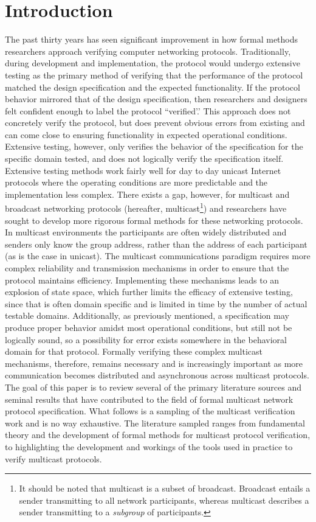 \documentclass[11pt, journal]{IEEEtran}
\begin{document}
\section{Introduction}
The past thirty years has seen significant improvement in how formal methods researchers approach verifying computer networking protocols. Traditionally, during development and implementation, the protocol would undergo extensive testing as the primary method of verifying that the performance of the protocol matched the design specification and the expected functionality. If the protocol behavior mirrored that of the design specification, then researchers and designers felt confident enough to label the protocol ``verified'.' This approach does not concretely verify the protocol, but does prevent obvious errors from existing and can come close to ensuring functionality in expected operational conditions. Extensive testing, however, only verifies the behavior of the specification for the specific domain tested, and does not logically verify the specification itself.
\bigbreak
Extensive testing methods work fairly well for day to day unicast Internet protocols where the operating conditions are more predictable and the implementation less complex. There exists a gap, however, for multicast and broadcast networking protocols (hereafter, multicast\footnote{It should be noted that multicast is a subset of broadcast. Broadcast entails a sender transmitting to all network participants, whereas multicast describes a sender transmitting to a \textit{subgroup} of participants.}) and researchers have sought to develop more rigorous formal methods for these networking protocols. In multicast environments the participants are often widely distributed and senders only know the group address, rather than the address of each participant (as is the case in unicast). The multicast communications paradigm requires more complex reliability and transmission mechanisms in order to ensure that the protocol maintains efficiency. Implementing these mechanisms leads to an explosion of state space, which further limits the efficacy of extensive testing, since that is often domain specific and is limited in time by the number of actual testable domains. Additionally, as previously mentioned, a specification may produce proper behavior amidst most operational conditions, but still not be logically sound, so a possibility for error exists somewhere in the behavioral domain for that protocol. Formally verifying these complex multicast mechanisms, therefore, remains necessary and is increasingly important as more communication becomes distributed and asynchronous across multicast protocols.
\bigbreak
The goal of this paper is to review several of the primary literature sources and seminal results that have contributed to the field of formal multicast network protocol specification. What follows is a sampling of the multicast verification work and is no way exhaustive. The literature sampled ranges from fundamental theory and the development of formal methods for multicast protocol verification, to highlighting the development and workings of the tools used in practice to verify multicast protocols.
\end{document}
